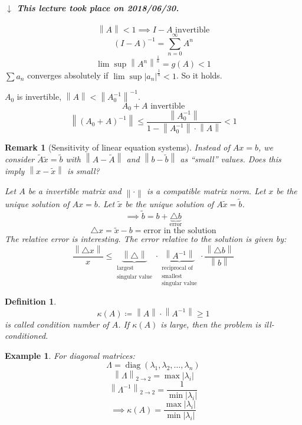\documentclass[a4paper]{article}
\newcounter{lecref}[section]
\numberwithin{lecref}{section}
\newtheorem{example}[lecref]{Example}
\newtheorem{definition}[lecref]{Definition}
\newtheorem{remark}[lecref]{Remark}
\newcommand{\norm}[1]{\left\|#1\right\|}
\newcommand{\card}[1]{\left|#1\right|}
\newcommand{\dateref}[1]{%
  \begin{mdframed}[backgroundcolor=gray!10,innerbottommargin=0pt,innertopmargin=0pt]
    \paragraph{\textit{$\downarrow$ This lecture took place on #1.}}%
  \end{mdframed}%
}
\begin{document}
\dateref{2018/06/30}

\[ \norm{A} < 1 \implies I-A \text{ invertible} \]
\[ (I - A)^{-1} = \sum_{n=0}^\infty A^n \]
\[ \lim\sup \norm{A^n}^{\frac1n} = g(A) < 1 \]
$\sum a_n$ converges absolutely if $\lim\sup{\card{a_n}^{\frac1n}} < 1$. So it holds.

$A_0$ is invertible, $\norm{A} < \norm{A_0^{-1}}^{-1}$.
\[ A_0 + A \text{ invertible} \]
\[ \norm{(A_0 + A)^{-1}} \leq \frac{\norm{A_0^{-1}}}{1 - \norm{A_0^{-1}} \cdot \norm{A}} < 1 \]

\begin{remark}[Sensitivity of linear equation systems] %
  \label{rem:sens}
  Instead of $Ax = b$, we consider $\tilde A \tilde x = \tilde b$
  with $\norm{A - \tilde A}$ and $\norm{b - \tilde b}$ as \enquote{small} values.
  Does this imply $\norm{x - \tilde x}$ is small?

  Let $A$ be a invertible matrix and $\norm{\cdot}$ is a compatible matrix norm.
  Let $x$ be the unique solution of $Ax = b$.
  Let $\tilde x$ be the unique solution of $A \tilde x = \tilde b$.
  \[ \implies \tilde b = b + \underbrace{\triangle b}_{\text{error}} \]
  \[ \triangle x = \tilde x - b = \text{error in the solution} \]
  The relative error is interesting.
  The error relative to the solution is given by:
  \[ \frac{\norm{\triangle x}}{x} \leq \underbrace{\norm{\triangle}}_{\substack{\text{largest} \\ \text{singular value}}} \cdot \underbrace{\norm{A^{-1}}}_{\substack{\text{reciprocal of} \\ \text{smallest} \\ \text{singular value}}} \cdot \frac{\norm{\triangle b}}{\norm{b}} \]
\end{remark}

\begin{definition} %
  \[ \kappa(A) \coloneqq \norm{A} \cdot \norm{A^{-1}} \geq 1 \]
  is called \emph{condition number of $A$}.
  If $\kappa(A)$ is large, then the problem is ill-conditioned.
\end{definition}

\begin{example} %
  For diagonal matrices:
  \[ \Lambda = \operatorname{diag}(\lambda_1, \lambda_2, \dots, \lambda_n) \]
  \[ \norm{\Lambda}_{2 \to 2} = \max\card{\lambda_i} \]
  \[ \norm{\Lambda^{-1}}_{2 \to 2} = \frac{1}{\min\card{\lambda_i}} \]
  \[ \implies \kappa(A) = \frac{\max\card{\lambda_i}}{\min\card{\lambda_i}} \]
\end{example}
\end{document}
